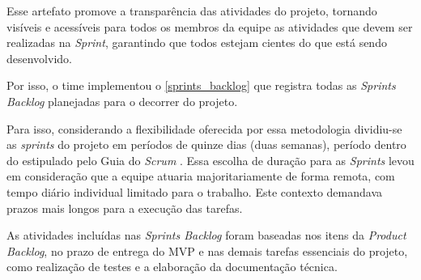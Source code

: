 \documentclass[
	12pt,				%
	openany,			%
	twoside,			%
	a4paper,			%
	english,			%
	french,				%
	spanish,			%
	brazil				%
	]{abntex2}
\begin{document}
Esse artefato promove a transparência das atividades do projeto, tornando visíveis e acessíveis para todos os membros da equipe as atividades que devem ser realizadas na \textit {Sprint}, garantindo que todos estejam cientes do que está sendo desenvolvido.

Por isso, o time implementou o \autoref{sprints_backlog} que registra todas as \textit {Sprints Backlog} planejadas para o decorrer do projeto.

Para isso, considerando a flexibilidade oferecida por essa metodologia dividiu-se as \textit {sprints} do projeto em períodos de quinze dias (duas semanas), período dentro do estipulado pelo Guia do \textit{Scrum} \cite{scrumguide}. Essa escolha de duração para as \textit {Sprints} levou em consideração que a equipe atuaria majoritariamente de forma remota, com tempo diário individual limitado para o trabalho. Este contexto demandava prazos mais longos para a execução das tarefas.

As atividades incluídas nas \textit {Sprints Backlog} foram baseadas nos itens da \textit {Product Backlog}, no prazo de entrega do MVP e nas demais tarefas essenciais do projeto, como realização de testes e a elaboração da documentação técnica.
\end{document}
